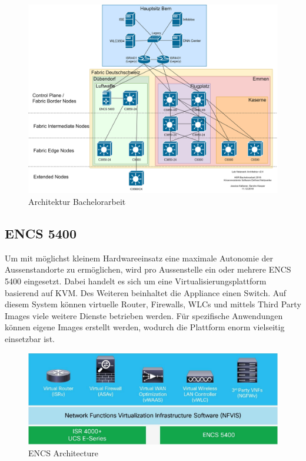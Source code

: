 \begin{figure}[H]
	\centering
	\includegraphics[width=1\linewidth]{img/Architecture/LabNetworkArchitecture-11-12}
	\caption{Architektur Bachelorarbeit}
	\label{fig:Architektur Bachelorarbeit}
\end{figure}




\subsection{ENCS 5400}

Um mit möglichst kleinem Hardwareeinsatz eine maximale Autonomie der Aussenstandorte zu ermöglichen, wird pro Aussenstelle ein oder mehrere ENCS 5400 eingesetzt. 
Dabei handelt es sich um eine Virtualisierungsplattform basierend auf KVM. Des Weiteren beinhaltet die Appliance einen Switch. 
Auf diesem System können virtuelle Router, Firewalls, WLCs und mittels Third Party Images viele weitere Dienste betrieben werden. Für spezifische Anwendungen können eigene Images erstellt werden, wodurch die Plattform enorm vielseitig einsetzbar ist.

\begin{figure}[H]
	\centering
	\includegraphics[width=0.8\linewidth]{img/Absicherung/ENCS_Architecture.png}
	\caption{ENCS Architecture \cite{enterprise-network-functions-virtualization-faq} }
	\label{fig:ENCS Architecture}
\end{figure}

